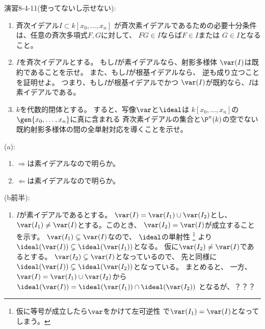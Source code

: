 \begin{framed}
  演習8-4-11(使ってないし示せない):
  \begin{enumerate}[label=(\alph*)]
    \item
    斉次イデアル$I\subset k[x_0,\dots,x_n]$
    が斉次素イデアルであるための必要十分条件
    は、任意の斉次多項式$F,G$に対して、
    $FG\in I$ならば$F\in I$または
    $G\in I$となること。
    \item
    $I$を斉次イデアルとする。
    もし$I$が素イデアルなら、射影多様体
    $\var(I)$は既約であることを示せ。
    また、もし$I$が根基イデアルなら、
    逆も成り立つことを証明せよ。
    つまり、もし$I$が根基イデアルでかつ
    $\var(I)$が既約なら、$I$は素イデアルである。
    \item
    $k$を代数的閉体とする。
    すると、写像$\var$と$\ideal$は
    $k[x_0,\dots,x_n]$の
    $\gen{x_0,\dots,x_n}$に真に含まれる
    斉次素イデアルの集合と$\P^n(k)$の空でない
    既約射影多様体の間の全単射対応を導くことを示せ。
  \end{enumerate}
\end{framed}
\begin{myproof}
  (a):
  \begin{enumerate}
    \item $\Rightarrow$は素イデアルなので明らか。
    \item $\Leftarrow$は素イデアルなので明らか。
  \end{enumerate}

  (b前半):
  \begin{enumerate}
    \item $I$が素イデアルであるとする。
    $\var(I) = \var(I_1) \cup \var(I_2)$とし、
    $\var(I_1) \neq \var(I)$とする。このとき、
    $\var(I_2) = \var(I)$が成立することを示す。
    $\var(I_1)\subsetneq \var(I)$なので、
    $\ideal$の単射性
    \footnote{仮に等号が成立したら$\var$をかけて左可逆性
    で$\var(I_1)=\var(I)$となってしまう。}
    より$\ideal(\var(I)) \subsetneq \ideal(\var(I_1))$となる。
    仮に$\var(I_2)\neq \var(I)$であるとする。
    $\var(I_2)\subsetneq \var(I)$となっているので、
    先と同様に$\ideal(\var(I)) \subsetneq \ideal(\var(I_2))$となっている。
    まとめると、
    一方、$\var(I) = \var(I_1)\cup \var(I_2)$から
    $\ideal(\var(I)) = \ideal(\var(I_1)) \cap \ideal(\var(I_2))$
    となるが、？？？
  \end{enumerate}
\end{myproof}


